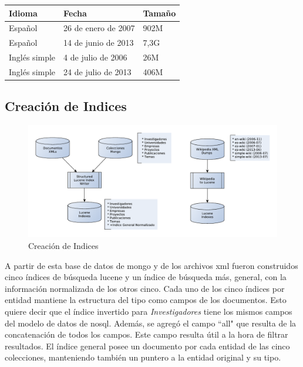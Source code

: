\medskip

\begin{center}
\begin{tabular}{ | l | l | l |}
    \hline
    Idioma & Fecha & Tamaño\\ \hline
    Español & 26 de enero de 2007 & 902M \\ \hline
    Español & 14 de junio de 2013 & 7,3G \\ \hline
    Inglés simple & 4 de julio de 2006 & 26M \\ \hline
    Inglés simple & 24 de julio de 2013 & 406M \\ \hline
 \end{tabular}
\end{center}


\subsection{Creación de Indices}

\begin{figure}[H]
  \centering
    \includegraphics[scale=0.86]{graficos/LuceneWritersJuntos}
  \caption{Creación de Indices}
  \label{fig:LuceneIndexWriterBoth}
\end{figure}

A partir de esta base de datos de mongo y de los archivos xml fueron construidos cinco índices
de búsqueda lucene y un índice de búsqueda más, general, con la
información normalizada de los otros cinco. 
Cada uno de los cinco índices por entidad mantiene la estructura del tipo como campos de los documentos.
Esto quiere decir que el índice invertido para \emph{Investigadores} tiene los mismos campos
del modelo de datos de nosql. Además, se agregó el campo ``all" que resulta de la concatenación de
todos los campos. Este campo resulta útil a la hora de filtrar resultados. 
El índice general posee un documento por cada entidad de las cinco colecciones, 
manteniendo también un puntero a la entidad original y su tipo.

